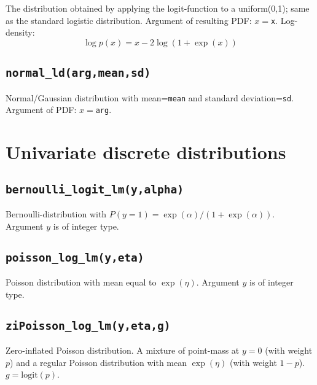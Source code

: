 \documentclass[
]{book}
\begin{document}
The distribution obtained by applying the logit-function to a uniform(0,1); same as the standard logistic distribution. Argument of resulting PDF: \(x=\)\texttt{x}. Log-density:
\[
\log p(x) = x - 2\log(1+\exp(x))
\]

\hypertarget{normal_ldargmeansd}{%
\subsection{\texorpdfstring{\texttt{normal\_ld(arg,mean,sd)}}{normal\_ld(arg,mean,sd)}}\label{normal_ldargmeansd}}

Normal/Gaussian distribution with mean=\texttt{mean} and standard deviation=\texttt{sd}. Argument of PDF: \(x=\)\texttt{arg}.

\hypertarget{univariate-discrete-distributions}{%
\section{Univariate discrete distributions}\label{univariate-discrete-distributions}}

\hypertarget{bernoulli_logit_lmyalpha}{%
\subsection{\texorpdfstring{\texttt{bernoulli\_logit\_lm(y,alpha)}}{bernoulli\_logit\_lm(y,alpha)}}\label{bernoulli_logit_lmyalpha}}

Bernoulli-distribution with \(P(y=1)=\exp(\alpha)/(1+\exp(\alpha))\). Argument \(y\) is of integer type.

\hypertarget{poisson_log_lmyeta}{%
\subsection{\texorpdfstring{\texttt{poisson\_log\_lm(y,eta)}}{poisson\_log\_lm(y,eta)}}\label{poisson_log_lmyeta}}

Poisson distribution with mean equal to \(\exp(\eta)\). Argument \(y\) is of integer type.

\hypertarget{zipoisson_log_lmyetag}{%
\subsection{\texorpdfstring{\texttt{ziPoisson\_log\_lm(y,eta,g)}}{ziPoisson\_log\_lm(y,eta,g)}}\label{zipoisson_log_lmyetag}}

Zero-inflated Poisson distribution. A mixture of point-mass at \(y=0\) (with weight \(p\)) and a regular Poisson distribution with mean \(\exp(\eta)\) (with weight \(1-p\)). \(g=\text{logit}(p)\).
\end{document}
